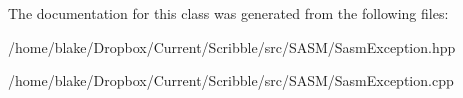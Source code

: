 The documentation for this class was generated from the following files\-:\begin{DoxyCompactItemize}
\item 
/home/blake/\-Dropbox/\-Current/\-Scribble/src/\-S\-A\-S\-M/Sasm\-Exception.\-hpp\item 
/home/blake/\-Dropbox/\-Current/\-Scribble/src/\-S\-A\-S\-M/Sasm\-Exception.\-cpp\end{DoxyCompactItemize}
